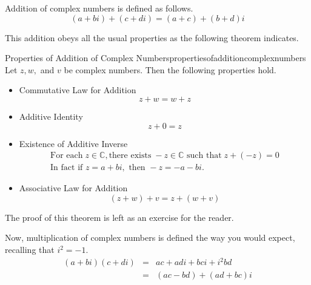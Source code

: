 Addition of complex numbers is defined as follows. 
\begin{equation*}
\left( a+bi\right) +\left( c+di\right) =\left( a+c\right) +\left( b+d\right)i
\end{equation*}

This addition obeys all the usual properties  as the following theorem indicates.

\begin{theorem}{Properties of Addition of Complex Numbers}{propertiesofadditioncomplexnumbers}
Let $z,w,$ and $v$ be complex numbers. Then the following properties hold.
\begin{itemize}
\item Commutative Law for Addition
\begin{equation*}
z+w=w+z
\end{equation*}

\item Additive Identity
\begin{equation*}
z+0=z
\end{equation*}

\item Existence of Additive Inverse
\begin{equation*}
\begin{array}{l}
\mbox{For each} \; z\in \mathbb{C}, \mbox{there exists}\; -z\in \mathbb{C} \mbox{ such that}\; 
z+\left( -z\right) =0 \\
\mbox{In fact if } z=a+bi, \mbox{ then } -z=-a-bi.
\end{array}
\end{equation*}

\item Associative Law for Addition
\begin{equation*}
\left( z+w\right) +v= z +\left( w+v\right)
\end{equation*}
\end{itemize}
\end{theorem}

The proof of this theorem is left as an exercise for the reader.

Now, multiplication of complex numbers is defined the way you would expect, recalling that $i^{2} = -1$.
\begin{eqnarray*}
\left( a+bi\right) \left( c+di\right) &=&ac+adi+bci+i^{2}bd \\
&=&\left( ac-bd\right) +\left( ad + bc \right)i 
\end{eqnarray*}

